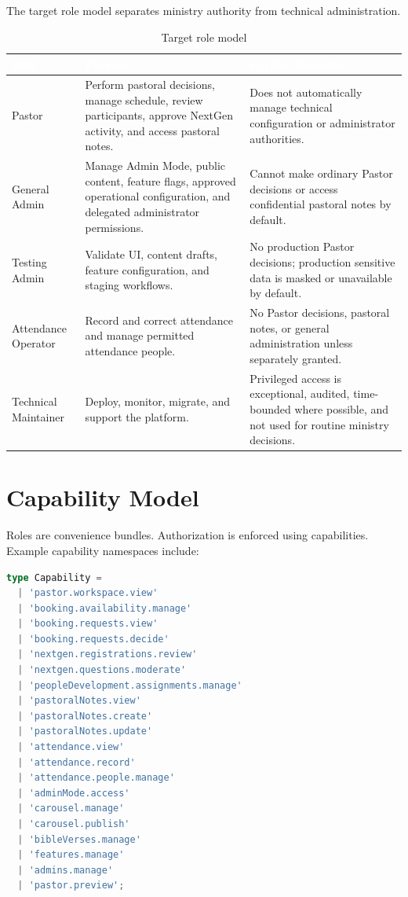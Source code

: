 \documentclass[11pt,a4paper,oneside]{report}
\begin{document}
The target role model separates ministry authority from technical administration.

\begin{table}[H]
\centering
{}
\begin{tabularx}{\linewidth}{@{}l X X@{}}
\toprule
\rowcolor{primary}
\textcolor{white}{\textbf{Role}} & \textcolor{white}{\textbf{Purpose}} & \textcolor{white}{\textbf{Explicit Boundary}} \\
\midrule
Pastor & Perform pastoral decisions, manage schedule, review participants, approve NextGen activity, and access pastoral notes. & Does not automatically manage technical configuration or administrator authorities. \\
General Admin & Manage Admin Mode, public content, feature flags, approved operational configuration, and delegated administrator permissions. & Cannot make ordinary Pastor decisions or access confidential pastoral notes by default. \\
Testing Admin & Validate UI, content drafts, feature configuration, and staging workflows. & No production Pastor decisions; production sensitive data is masked or unavailable by default. \\
Attendance Operator & Record and correct attendance and manage permitted attendance people. & No Pastor decisions, pastoral notes, or general administration unless separately granted. \\
Technical Maintainer & Deploy, monitor, migrate, and support the platform. & Privileged access is exceptional, audited, time-bounded where possible, and not used for routine ministry decisions. \\
\bottomrule
\end{tabularx}
\caption{Target role model}
\end{table}

\section{Capability Model}

Roles are convenience bundles. Authorization is enforced using capabilities. Example capability namespaces include:

\begin{lstlisting}[language=TypeScript,caption={Illustrative capability catalog}]
type Capability =
  | 'pastor.workspace.view'
  | 'booking.availability.manage'
  | 'booking.requests.view'
  | 'booking.requests.decide'
  | 'nextgen.registrations.review'
  | 'nextgen.questions.moderate'
  | 'peopleDevelopment.assignments.manage'
  | 'pastoralNotes.view'
  | 'pastoralNotes.create'
  | 'pastoralNotes.update'
  | 'attendance.view'
  | 'attendance.record'
  | 'attendance.people.manage'
  | 'adminMode.access'
  | 'carousel.manage'
  | 'carousel.publish'
  | 'bibleVerses.manage'
  | 'features.manage'
  | 'admins.manage'
  | 'pastor.preview';
\end{lstlisting}
\end{document}
